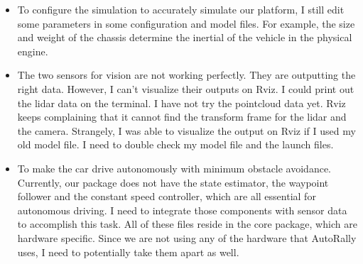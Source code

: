 \documentclass[compsoc,draftclsnofoot,onecolumn,10pt]{IEEEtran}
\begin{document}
\begin{itemize}
	\item To configure the simulation to accurately simulate our platform, I still edit some parameters in some configuration and model files. For example, the size and weight of the chassis determine the inertial of the vehicle in the physical engine.  
	\item The two sensors for vision are not working perfectly. They are outputting the right data. However, I can't visualize their outputs on Rviz. I could print out the lidar data on the terminal. I have not try the pointcloud data yet. Rviz keeps complaining that it cannot find the transform frame for the lidar and the camera. Strangely, I was able to visualize the output on Rviz if I used my old model file. I need to double check my model file and the launch files. 
	\item To make the car drive autonomously with minimum obstacle avoidance. Currently, our package does not have the state estimator, the waypoint follower and the constant speed controller, which are all essential for autonomous driving. I need to integrate those components with sensor data to accomplish this task. All of these files reside in the core package, which are hardware specific. Since we are not using any of the hardware that AutoRally uses, I need to potentially take them apart as well. 
\end{itemize}
\end{document}
